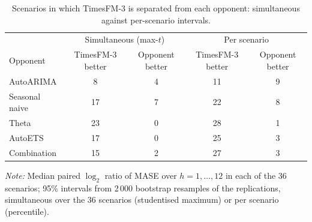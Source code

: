 \documentclass[ASNA]{USG}
\begin{document}
\begin{table}[!htbp]
\centering
\begin{threeparttable}
\caption{Scenarios in which TimesFM-3 is separated from each opponent: simultaneous against per-scenario intervals.}
\label{tab:si-simult}
\small\setlength{\tabcolsep}{4pt}
\begin{tabular}{lcccc}
\toprule
& \multicolumn{2}{c}{Simultaneous (max-$t$)} & \multicolumn{2}{c}{Per scenario} \\
Opponent & TimesFM-3 better & Opponent better & TimesFM-3 better & Opponent better \\
\midrule
AutoARIMA & 8 & 4 & 11 & 9 \\
Seasonal naive & 17 & 7 & 22 & 8 \\
Theta & 23 & 0 & 28 & 1 \\
AutoETS & 17 & 0 & 25 & 3 \\
Combination & 15 & 2 & 27 & 3 \\
\bottomrule
\end{tabular}
\begin{tablenotes}[flushleft]\footnotesize
\item \textit{Note:} Median paired $\log_2$ ratio of MASE over $h = 1, \dots, 12$ in each of the 36 scenarios; 95\% intervals from 2\,000 bootstrap resamples of the replications, simultaneous over the 36 scenarios (studentised maximum) or per scenario (percentile).
\end{tablenotes}
\end{threeparttable}
\end{table}
\end{document}
